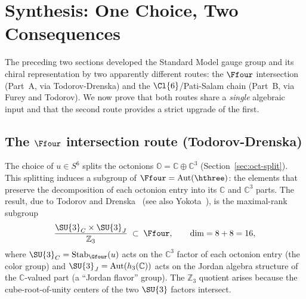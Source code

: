 
\section{Synthesis: One Choice, Two Consequences}\label{sec:synthesis}

The preceding two sections developed the Standard Model gauge group
and its chiral representation by two apparently different routes:
the $\Ffour$ intersection (Part~A, via Todorov-Drenska) and the
$\Cl{6}$/Pati-Salam chain (Part~B, via Furey and Todorov).
We now prove that both routes share a \emph{single} algebraic input
and that the second route provides a strict upgrade of the first.

\subsection{The \texorpdfstring{$\Ffour$}{F4} intersection route (Todorov-Drenska)}\label{sec:F4-route}

The choice of $u\in S^6$ splits the octonions
$\mathbb{O} = \mathbb{C}\oplus\mathbb{C}^3$
(Section~\ref{sec:oct-split}).  This splitting induces a subgroup
of $\Ffour = \mathrm{Aut}(\hthree)$: the elements that preserve the
decomposition of each octonion entry into its $\mathbb{C}$ and
$\mathbb{C}^3$ parts.  The result, due to Todorov and
Drenska~\cite{TodorovDrenska2018}
(see also Yokota~\cite{Yokota2009}), is the maximal-rank subgroup
\begin{equation}\label{eq:F4-break}
  \frac{\SU{3}_C\times\SU{3}_J}{\mathbb{Z}_3}
  \;\subset\; \Ffour,
  \qquad \dim = 8 + 8 = 16,
\end{equation}
where $\SU{3}_C = \mathrm{Stab}_{\Gfour}(u)$ acts on the
$\mathbb{C}^3$ factor of each octonion entry (the color group)
and $\SU{3}_J = \mathrm{Aut}(h_3(\mathbb{C}))$ acts on the
Jordan algebra structure of the $\mathbb{C}$-valued part (a
``Jordan flavor'' group).  The $\mathbb{Z}_3$ quotient arises
because the cube-root-of-unity centers of the two $\SU{3}$ factors
intersect.


